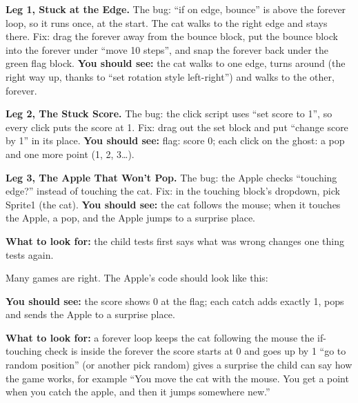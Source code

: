 \begin{answer}
\textbf{Leg 1, Stuck at the Edge.} The bug: \enquote{if on edge, bounce} is above the forever loop, so it runs once, at the start. The cat walks to the right edge and stays there. Fix: drag the forever away from the bounce block, put the bounce block into the forever under \enquote{move 10 steps}, and snap the forever back under the green flag block. \textbf{You should see:} the cat walks to one edge, turns around (the right way up, thanks to \enquote{set rotation style left-right}) and walks to the other, forever.

\textbf{Leg 2, The Stuck Score.} The bug: the click script uses \enquote{set score to 1}, so every click puts the score at 1. Fix: drag out the set block and put \enquote{change score by 1} in its place. \textbf{You should see:} flag: score 0; each click on the ghost: a pop and one more point (1, 2, 3\ldots).

\textbf{Leg 3, The Apple That Won't Pop.} The bug: the Apple checks \enquote{touching edge?} instead of touching the cat. Fix: in the touching block's dropdown, pick Sprite1 (the cat). \textbf{You should see:} the cat follows the mouse; when it touches the Apple, a pop, and the Apple jumps to a surprise place.

\textbf{What to look for:} \tickbox{} the child tests first \quad \tickbox{} says what was wrong \quad \tickbox{} changes one thing \quad \tickbox{} tests again.
\end{answer}

\begin{answer}
Many games are right. The Apple's code should look like this:
\begin{center}
\begin{scratch}[scale=0.85]
\end{scratch}
\end{center}
\textbf{You should see:} the score shows 0 at the flag; each catch adds exactly 1, pops and sends the Apple to a surprise place.

\textbf{What to look for:} \tickbox{} a forever loop keeps the cat following the mouse \quad \tickbox{} the if-touching check is inside the forever \quad \tickbox{} the score starts at 0 and goes up by 1 \quad \tickbox{} \enquote{go to random position} (or another pick random) gives a surprise \quad \tickbox{} the child can say how the game works, for example \enquote{You move the cat with the mouse. You get a point when you catch the apple, and then it jumps somewhere new.}
\end{answer}


